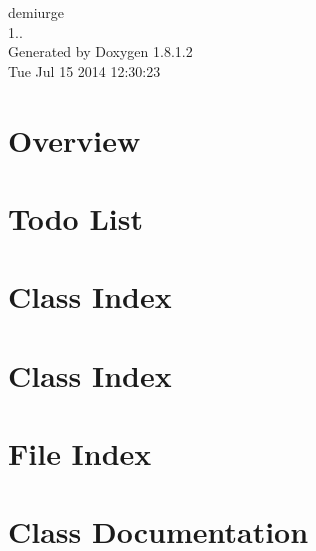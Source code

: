 \documentclass{book}
\begin{document}
\hypersetup{pageanchor=false,citecolor=blue}
\begin{titlepage}
\vspace*{7cm}
\begin{center}
{\Large demiurge \\[1ex]\large 1.. }\\
\vspace*{1cm}
{\large Generated by Doxygen 1.8.1.2}\\
\vspace*{0.5cm}
{\small Tue Jul 15 2014 12:30:23}\\
\end{center}
\end{titlepage}
\clearemptydoublepage
{}
\tableofcontents
\clearemptydoublepage
{}
\hypersetup{pageanchor=true,citecolor=blue}
\chapter{Overview}
\label{index}\hypertarget{index}{}
\chapter{Todo List}
\label{todo}
\hypertarget{todo}{}

\chapter{Class Index}

\chapter{Class Index}

\chapter{File Index}

\chapter{Class Documentation}











































\end{document}
